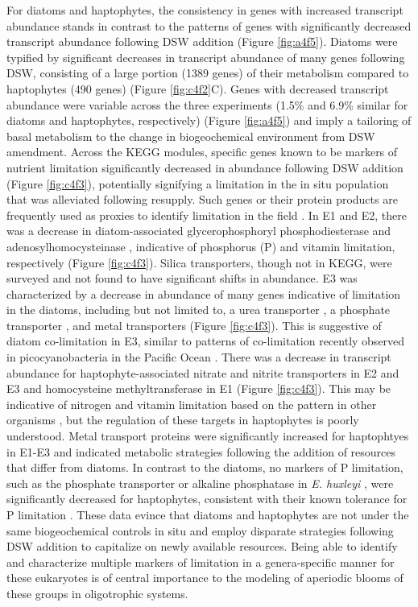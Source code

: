 For diatoms and haptophytes, the consistency in genes with increased transcript abundance stands in contrast to the patterns of genes with significantly decreased transcript abundance following DSW addition (Figure \ref{fig:a4f5}). Diatoms were typified by significant decreases in transcript abundance of many genes following DSW, consisting of a large portion (1389 genes) of their metabolism compared to haptophytes (490 genes) (Figure \ref{fig:c4f2}C). Genes with decreased transcript abundance were variable across the three experiments (1.5\% and 6.9\% similar for diatoms and haptophytes, respectively) (Figure \ref{fig:a4f5}) and imply a tailoring of basal metabolism to the change in biogeochemical environment from DSW amendment. Across the KEGG modules, specific genes known to be markers of nutrient limitation significantly decreased in abundance following DSW addition (Figure \ref{fig:c4f3}), potentially signifying a limitation in the in situ population that was alleviated following resupply. Such genes or their protein products are frequently used as proxies to identify limitation in the field \citep{Saito2014}. In E1 and E2, there was a decrease in diatom-associated glycerophosphoryl phosphodiesterase \citep{Dyhrman2012} and adenosylhomocysteinase \citep{Bertrand2012a}, indicative of phosphorus (P) and vitamin limitation, respectively (Figure \ref{fig:c4f3}). Silica transporters, though not in KEGG, were surveyed and not found to have significant shifts in abundance. E3 was characterized by a decrease in abundance of many genes indicative of limitation in the diatoms, including but not limited to, a urea transporter \citep{Bender2012}, a phosphate transporter \citep{Dyhrman2012}, and metal transporters (Figure \ref{fig:c4f3}). This is suggestive of diatom co-limitation in E3, similar to patterns of co-limitation recently observed in picocyanobacteria in the Pacific Ocean \citep{Saito2014}. There was a decrease in transcript abundance for haptophyte-associated nitrate and nitrite transporters in E2 and E3 and homocysteine methyltransferase in E1 (Figure \ref{fig:c4f3}). This may be indicative of nitrogen and vitamin limitation based on the pattern in other organisms \citep{Bertrand2012a, Bender2014}, but the regulation of these targets in haptophytes is poorly understood. Metal transport proteins were significantly increased for haptophtyes in E1-E3 and indicated metabolic strategies following the addition of resources that differ from diatoms. In contrast to the diatoms, no markers of P limitation, such as the phosphate transporter or alkaline phosphatase in \textit{E. huxleyi} \citep{Dyhrman2006, Dyhrman2003, Xu2006}, were significantly decreased for haptophytes, consistent with their known tolerance for P limitation \citep{Lessard2005}. These data evince that diatoms and haptophytes are not under the same biogeochemical controls in situ and employ disparate strategies following DSW addition to capitalize on newly available resources. Being able to identify and characterize multiple markers of limitation in a genera-specific manner for these eukaryotes is of central importance to the modeling of aperiodic blooms of these groups in oligotrophic systems. \par 



